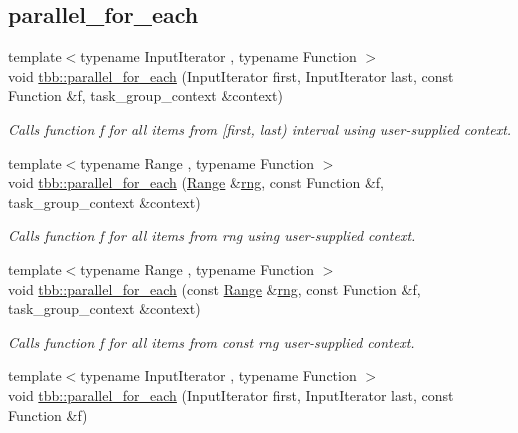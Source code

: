\subsection*{parallel\+\_\+for\+\_\+each}
\begin{DoxyCompactItemize}
\item 
{\footnotesize template$<$typename Input\+Iterator , typename Function $>$ }\\void \hyperlink{group__algorithms_ga96bf42caaec779e413e5a2396c1e301c}{tbb\+::parallel\+\_\+for\+\_\+each} (Input\+Iterator first, Input\+Iterator last, const Function \&f, task\+\_\+group\+\_\+context \&context)
\begin{DoxyCompactList}\small\item\em Calls function f for all items from \mbox{[}first, last) interval using user-\/supplied context. \end{DoxyCompactList}\item 
{\footnotesize template$<$typename Range , typename Function $>$ }\\void \hyperlink{group__algorithms_ga72131543fd218b67dbb048b768d534e4}{tbb\+::parallel\+\_\+for\+\_\+each} (\hyperlink{classtbb_1_1blocked__range}{Range} \&\hyperlink{structrng}{rng}, const Function \&f, task\+\_\+group\+\_\+context \&context)
\begin{DoxyCompactList}\small\item\em Calls function f for all items from rng using user-\/supplied context. \end{DoxyCompactList}\item 
{\footnotesize template$<$typename Range , typename Function $>$ }\\void \hyperlink{group__algorithms_gad7d0702d16fbd7554584ab735eed39ba}{tbb\+::parallel\+\_\+for\+\_\+each} (const \hyperlink{classtbb_1_1blocked__range}{Range} \&\hyperlink{structrng}{rng}, const Function \&f, task\+\_\+group\+\_\+context \&context)
\begin{DoxyCompactList}\small\item\em Calls function f for all items from const rng user-\/supplied context. \end{DoxyCompactList}\item 
\hypertarget{group__algorithms_gaef59e9baf9141a19c99a291e4532bd98}{}{\footnotesize template$<$typename Input\+Iterator , typename Function $>$ }\\void \hyperlink{group__algorithms_gaef59e9baf9141a19c99a291e4532bd98}{tbb\+::parallel\+\_\+for\+\_\+each} (Input\+Iterator first, Input\+Iterator last, const Function \&f)\label{group__algorithms_gaef59e9baf9141a19c99a291e4532bd98}


\end{DoxyCompactItemize}
